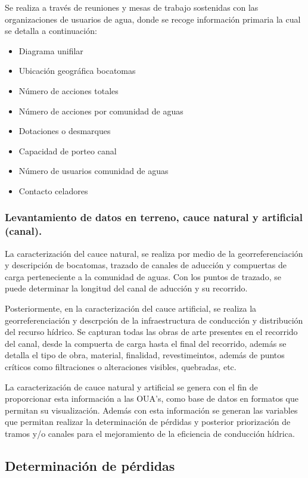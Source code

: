 \documentclass[]{article}
\begin{document}
Se realiza a través de reuniones y mesas de trabajo sostenidas con las organizaciones de usuarios de agua, donde se recoge información primaria la cual se detalla a continuación: 

\begin{itemize}
\item Diagrama unifilar
\item Ubicación geográfica bocatomas
\item Número de acciones totales
\item Número de acciones por comunidad de aguas
\item Dotaciones o desmarques
\item Capacidad de porteo canal
\item Número de usuarios comunidad de aguas
\item Contacto celadores
\end{itemize}

\subsubsection{Levantamiento de datos en terreno, cauce natural y artificial (canal).}

La caracterización del cauce natural, se realiza por medio de la georreferenciación y descripción de bocatomas, trazado de canales de aducción y compuertas de carga perteneciente a la comunidad de aguas. Con los puntos de trazado, se puede determinar la longitud del canal de aducción y su recorrido.

Posteriormente, en la caracterización del cauce artificial, se realiza la georreferenciación y descrpción de la infraestructura de conducción y distribución del recurso hídrico. Se capturan todas las obras de arte presentes en el recorrido del canal, desde la compuerta de carga hasta el final del recorrido, además se detalla el tipo de obra, material, finalidad, revestimeintos, además de puntos críticos como filtraciones o alteraciones visibles, quebradas, etc.

La caracterización de cauce natural y artificial se genera con el fin de proporcionar esta información a las OUA’s, como base de datos en formatos que permitan su visualización. Además con esta información se generan las variables que permitan realizar la determinación de pérdidas y posterior priorización de tramos y/o canales para el mejoramiento de la eficiencia de conducción hídrica.

\subsection{Determinación de pérdidas}
\end{document}
